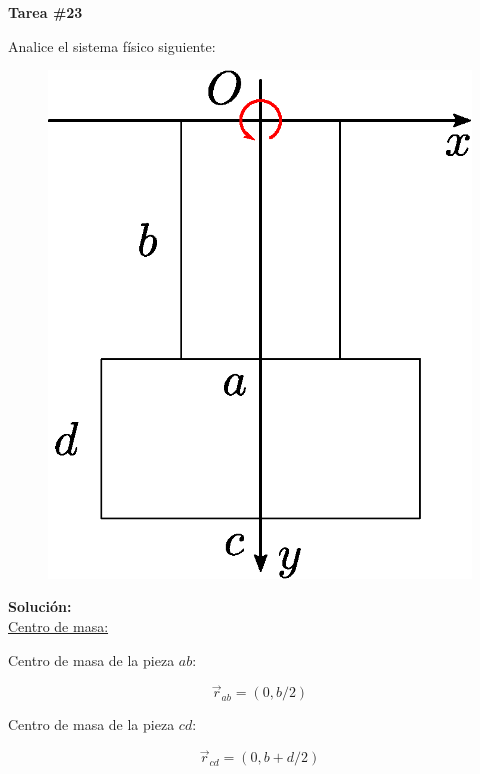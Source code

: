 \documentclass[letter,11pt]{article}
\begin{document}
\begin{center}
    {\Large \bf{Tarea \#23}}
\end{center}

Analice el sistema físico siguiente:
\\

\begin{figure}[!h]
\centering
\includegraphics[scale=0.50]{resources/f1.eps}
\end{figure}
\vspace{0.2cm}

\textbf{Solución:} \\

\underline{Centro de masa:}

Centro de masa de la pieza $ab$:

\begin{equation*}
    \vec{r}_{ab} = (0, b/2)
\end{equation*}
\vspace{-0.1cm}

Centro de masa de la pieza $cd$:

\begin{equation*}
    \vec{r}_{cd} = (0, b + d/2)
\end{equation*}
\vspace{-0.1cm}
\end{document}
